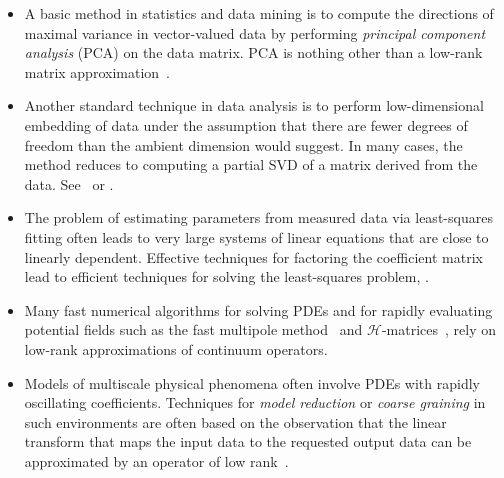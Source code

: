 \documentclass[final]{siamltex}
\newcounter{algorithm}[section]
\begin{document}
\lsp
\begin{itemize}
\item   A basic method in statistics and data mining is to compute the
directions of maximal variance in vector-valued data by performing
\emph{principal component analysis} (PCA) on the data matrix.
PCA is nothing other than a low-rank matrix
approximation~\cite[\S14.5]{HTF08:Elements-Statistical}.

\item   Another standard technique in data analysis is to perform
low-dimensional embedding of data under the assumption that there
are fewer degrees of freedom than the ambient dimension would suggest.
In many cases, the method reduces to computing a partial SVD of a matrix
derived from the data.  See~\cite[\S\S14.8--14.9]{HTF08:Elements-Statistical}
or \cite{coifman_PNAS_diffusionmaps}.

\item The problem of estimating parameters from measured data via
least-squares fitting often leads to very large systems of linear
equations that are close to linearly dependent. Effective techniques
for factoring the coefficient matrix lead to efficient techniques
for solving the least-squares problem,
\cite{2008_rokhlin_leastsquares}.

\item   Many fast numerical algorithms for solving PDEs and for rapidly evaluating
potential fields such as the fast multipole method~\cite{rokhlin1997}
and $\mathcal{H}$-matrices~\cite{hackbusch2003}, rely on low-rank approximations of
continuum operators.

\item Models of multiscale physical phenomena often involve PDEs with rapidly
oscillating coefficients. Techniques for  \emph{model reduction}
or \emph{coarse graining} in such environments are often based %
on the observation that the linear transform that maps the input data to the requested output
data %
can be approximated by an operator of low rank~\cite{engquist_wavelethomogenization}.
\end{itemize}
\end{document}
